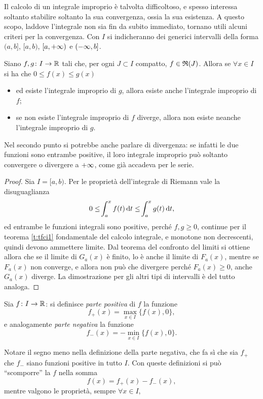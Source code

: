 Il calcolo di un integrale improprio è talvolta difficoltoso, e spesso interessa soltanto stabilire soltanto la sua convergenza, ossia la sua esistenza. A questo scopo, laddove l'integrale non sia fin da subito immediato, tornano utili alcuni criteri per la convergenza. Con $I$ si indicheranno dei generici intervalli della forma $(a,b]$, $[a,b)$, $[a,+\infty)$ e $(-\infty,b]$.
\begin{teorema} \label{t:confronto_int1}
Siano $f,g\colon I\to\mathbb{R}$ tali che, per ogni $J\subset I$ compatto, $f\in\mathfrak{R}(J)$. Allora se $\forall x\in I$ si ha che $0\leq f(x)\leq g(x)$
\begin{itemize}
\item ed esiste l'integrale improprio di $g$, allora esiste anche l'integrale improprio di $f$;
\item se non esiste l'integrale improprio di $f$ diverge, allora non esiste neanche l'integrale improprio di $g$.
\end{itemize}
\end{teorema}
Nel secondo punto si potrebbe anche parlare di divergenza: se infatti le due funzioni sono entrambe positive, il loro integrale improprio può soltanto convergere o divergere a $+\infty$, come già accadeva per le serie.
\begin{proof}
Sia $I=[a,b)$. Per le proprietà dell'integrale di Riemann vale la disuguaglianza
\[
0\leq\!\int_a^xf(t)\,\textup{d} t\leq\!\int_a^xg(t)\,\textup{d} t,
\]
ed entrambe le funzioni integrali sono positive, perché $f,g\geq 0$, continue per il teorema \ref{t:tfci1} fondamentale del calcolo integrale, e monotone non decrescenti, quindi devono ammettere limite. Dal teorema del confronto del limiti si ottiene allora che se il limite di $G_a(x)$ è finito, lo è anche il limite di $F_a(x)$, mentre se $F_a(x)$ non converge, e allora non può che divergere perché $F_a(x)\geq 0$, anche $G_a(x)$ diverge. La dimostrazione per gli altri tipi di intervalli è del tutto analoga.
\end{proof}
\begin{definizione}
Sia $f\colon I\to\mathbb{R}$: si definisce \emph{parte positiva} di $f$ la funzione
\[
f_+(x)=\max_{x\in I}\{f(x),0\},
\]
e analogamente \emph{parte negativa} la funzione
\[
f_-(x)=-\min_{x\in I}\{f(x),0\}.
\]
\end{definizione}
Notare il segno meno nella definizione della parte negativa, che fa sì che sia $f_+$ che $f_-$ siano funzioni positive in tutto $I$. Con queste definizioni si può ``scomporre'' la $f$ nella somma
\[
f(x)=f_+(x)-f_-(x),
\]
mentre valgono le proprietà, sempre $\forall x\in I$,
